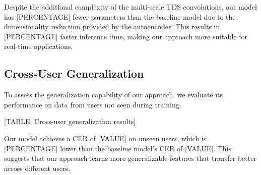 Despite the additional complexity of the multi-scale TDS convolutions, our model has [PERCENTAGE] fewer parameters than the baseline model due to the dimensionality reduction provided by the autoencoder. This results in [PERCENTAGE] faster inference time, making our approach more suitable for real-time applications.

\subsection{Cross-User Generalization}

To assess the generalization capability of our approach, we evaluate its performance on data from users not seen during training.

    [TABLE: Cross-user generalization results]

Our model achieves a CER of [VALUE] on unseen users, which is [PERCENTAGE] lower than the baseline model's CER of [VALUE]. This suggests that our approach learns more generalizable features that transfer better across different users.